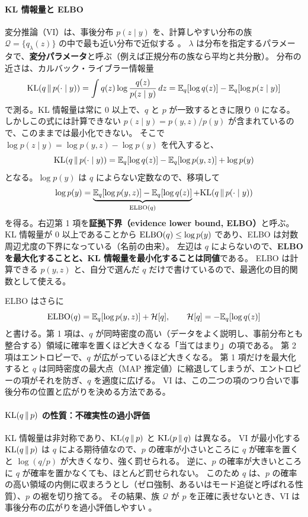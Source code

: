 \paragraph{KL 情報量と ELBO}
変分推論（VI）は、事後分布 $p(z \mid y)$ を、計算しやすい分布の族 $\mathcal{Q} = \{q_\lambda(z)\}$ の中で最も近い分布で近似する \parencite{blei2017}。
$\lambda$ は分布を指定するパラメータで、\textbf{変分パラメータ}と呼ぶ（例えば正規分布の族なら平均と共分散）。
分布の近さは、カルバック・ライブラー情報量
\[
  \mathrm{KL}(q \,\|\, p(\cdot \mid y)) = \int q(z) \log \frac{q(z)}{p(z \mid y)}\, dz = \mathbb{E}_q[\log q(z)] - \mathbb{E}_q[\log p(z \mid y)]
\]
で測る。KL 情報量は常に 0 以上で、$q$ と $p$ が一致するときに限り 0 になる。
しかしこの式には計算できない $p(z \mid y) = p(y, z) / p(y)$ が含まれているので、このままでは最小化できない。
そこで $\log p(z \mid y) = \log p(y, z) - \log p(y)$ を代入すると、
\begin{equation}
  \mathrm{KL}(q \,\|\, p(\cdot \mid y)) = \mathbb{E}_q[\log q(z)] - \mathbb{E}_q[\log p(y, z)] + \log p(y)
\end{equation}
となる。$\log p(y)$ は $q$ によらない定数なので、移項して
\begin{equation}
  \log p(y) = \underbrace{\mathbb{E}_q[\log p(y, z)] - \mathbb{E}_q[\log q(z)]}_{\mathrm{ELBO}(q)} + \mathrm{KL}(q \,\|\, p(\cdot \mid y))
  \label{eq:elbo-identity}
\end{equation}
を得る。右辺第 1 項を\textbf{証拠下界（evidence lower bound, ELBO）}と呼ぶ。
KL 情報量が 0 以上であることから $\mathrm{ELBO}(q) \leq \log p(y)$ であり、ELBO は対数周辺尤度の下界になっている（名前の由来）。
左辺は $q$ によらないので、\textbf{ELBO を最大化することと、KL 情報量を最小化することは同値}である。
ELBO は計算できる $p(y, z)$ と、自分で選んだ $q$ だけで書けているので、最適化の目的関数として使える。

ELBO はさらに
\begin{equation}
  \mathrm{ELBO}(q) = \mathbb{E}_q[\log p(y, z)] + \mathcal{H}[q], \qquad \mathcal{H}[q] = -\mathbb{E}_q[\log q(z)]
  \label{eq:elbo}
\end{equation}
と書ける。第 1 項は、$q$ が同時密度の高い（データをよく説明し、事前分布とも整合する）領域に確率を置くほど大きくなる「当てはまり」の項である。
第 2 項はエントロピーで、$q$ が広がっているほど大きくなる。
第 1 項だけを最大化すると $q$ は同時密度の最大点（MAP 推定値）に縮退してしまうが、エントロピーの項がそれを防ぎ、$q$ を適度に広げる。
VI は、この二つの項のつり合いで事後分布の位置と広がりを決める方法である。

\paragraph{$\mathrm{KL}(q \,\|\, p)$ の性質：不確実性の過小評価}
KL 情報量は非対称であり、$\mathrm{KL}(q \,\|\, p)$ と $\mathrm{KL}(p \,\|\, q)$ は異なる。
VI が最小化する $\mathrm{KL}(q \,\|\, p)$ は $q$ による期待値なので、$p$ の確率が小さいところに $q$ が確率を置くと $\log(q/p)$ が大きくなり、強く罰せられる。
逆に、$p$ の確率が大きいところに $q$ が確率を置かなくても、ほとんど罰せられない。
このため $q$ は、$p$ の確率の高い領域の内側に収まろうとし（ゼロ強制、あるいはモード追従と呼ばれる性質）、$p$ の裾を切り捨てる。
その結果、族 $\mathcal{Q}$ が $p$ を正確に表せないとき、VI は事後分布の広がりを過小評価しやすい \parencite{blei2017}。

